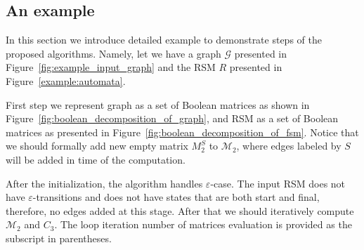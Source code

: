 \subsection{An example}
\label{example:section}
In this section we introduce detailed example to demonstrate steps of the 
proposed algorithms. Namely, let we have 
a graph $\mathcal{G}$ presented in Figure~\ref{fig:example_input_graph} and the 
RSM $R$ presented in Figure~\ref{example:automata}.

First step we represent graph as a set of Boolean matrices as shown in 
Figure~\ref{fig:boolean_decomposition_of_graph}, and RSM as a set of Boolean 
matrices as presented in Figure~\ref{fig:boolean_decomposition_of_fsm}.
Notice that we should formally add new empty matrix $M_2^{S}$ to $\mathcal{M}_2$, 
where edges labeled by $S$ will be added in time of the computation. 

After the initialization, the algorithm handles $\varepsilon$-case.
The input RSM does not have $\varepsilon$-transitions and does not have states
that are both start and final, therefore, no edges added at this stage. 
After that we should iteratively compute $\mathcal{M}_2$ and $C_3$.
The loop iteration number of matrices evaluation is provided as 
the subscript in parentheses.

